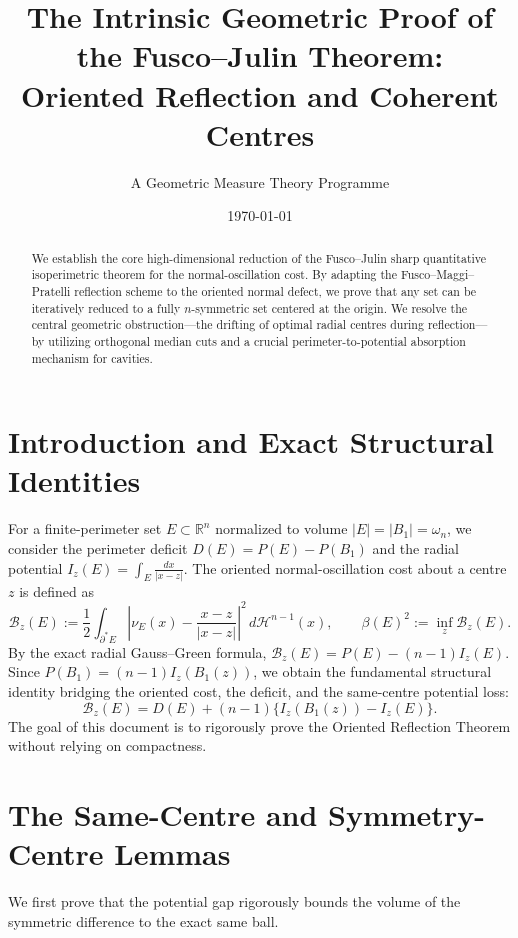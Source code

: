 \documentclass[11pt]{article}
\title{The Intrinsic Geometric Proof of the Fusco--Julin Theorem:\\ Oriented Reflection and Coherent Centres}
\author{A Geometric Measure Theory Programme}
\date{\today}
\newcommand{\R}{\mathbb{R}}
\newcommand{\B}{\mathcal{B}}
\newcommand{\cH}{\mathcal{H}}
\begin{document}
\maketitle

\begin{abstract}
We establish the core high-dimensional reduction of the Fusco--Julin sharp quantitative isoperimetric theorem for the normal-oscillation cost. By adapting the Fusco--Maggi--Pratelli reflection scheme to the oriented normal defect, we prove that any set can be iteratively reduced to a fully $n$-symmetric set centered at the origin. We resolve the central geometric obstruction---the drifting of optimal radial centres during reflection---by utilizing orthogonal median cuts and a crucial perimeter-to-potential absorption mechanism for cavities.
\end{abstract}

\section{Introduction and Exact Structural Identities}

For a finite-perimeter set $E \subset \R^n$ normalized to volume $|E| = |B_1| = \omega_n$, we consider the perimeter deficit $D(E) = P(E) - P(B_1)$ and the radial potential $I_z(E) = \int_E \frac{dx}{|x-z|}$. The oriented normal-oscillation cost about a centre $z$ is defined as
\[
  \B_z(E) := \frac{1}{2} \int_{\partial^* E} \left| \nu_E(x) - \frac{x-z}{|x-z|} \right|^2 \,d\cH^{n-1}(x), \qquad \beta(E)^2 := \inf_{z} \B_z(E).
\]
By the exact radial Gauss--Green formula, $\B_z(E) = P(E) - (n-1)I_z(E)$. Since $P(B_1) = (n-1)I_z(B_1(z))$, we obtain the fundamental structural identity bridging the oriented cost, the deficit, and the same-centre potential loss:
\[
  \B_z(E) = D(E) + (n-1)\{ I_z(B_1(z)) - I_z(E) \}. \label{eq:structural} \tag{1.1}
\]
The goal of this document is to rigorously prove the Oriented Reflection Theorem without relying on compactness.

\section{The Same-Centre and Symmetry-Centre Lemmas}

We first prove that the potential gap rigorously bounds the volume of the symmetric difference to the exact same ball.
\end{document}
